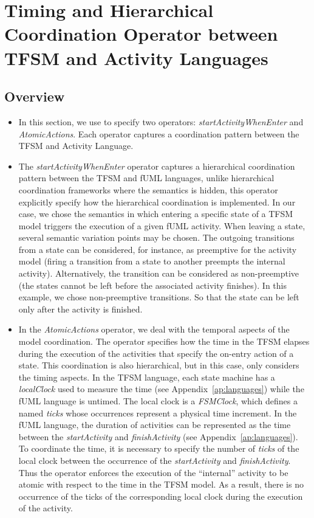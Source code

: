 \section{Timing and Hierarchical Coordination Operator between TFSM and Activity Languages}
\subsection{Overview}
	\begin{itemize}
		\item In this section, we use \bcool to specify two operators: \emph{startActivityWhenEnter} and \emph{AtomicActions}. Each operator captures a coordination pattern between the TFSM and Activity Language. 
		
		\item The \emph{startActivityWhenEnter} operator captures a hierarchical coordination pattern between the TFSM and fUML languages, unlike hierarchical coordination frameworks where the semantics is hidden, this operator explicitly specify how the hierarchical coordination is implemented. In our case, we chose the semantics in which entering a specific state of a TFSM model triggers the execution of a given fUML activity. When leaving a state, several semantic variation points may be chosen. The outgoing transitions from a state can be considered, for instance, as preemptive for the activity model (\ie firing a transition from a state to another preempts the internal activity). Alternatively, the transition can be considered as non-preemptive (\ie the states cannot be left before the associated activity finishes). In this example, we chose non-preemptive transitions. So that the state can be left only after the activity is finished. 
		
		\item In the \emph{AtomicActions} operator, we deal with the temporal aspects of the model coordination. The operator specifies how the time in the TFSM elapses during the execution of the activities that specify the on-entry action of a state. This coordination is also hierarchical, but in this case, only considers the timing aspects. In the TFSM language, each state machine has a \emph{localClock} used to measure the time (see Appendix~\ref{ap:languages}) while the fUML language is untimed. The local clock is a \emph{FSMClock}, which defines a \dse named \emph{ticks} whose occurrences represent a physical time increment. In the fUML language, the duration of activities can be represented as the time between the \dse \emph{startActivity} and \dse \emph{finishActivity} (see Appendix~\ref{ap:languages}). To coordinate the time, it is necessary to specify the number of \emph{ticks} of the local clock between the occurrence of the \dse \emph{startActivity} and \emph{finishActivity}. Thus the operator enforces the execution of the ``internal'' activity to be atomic with respect to the time in the TFSM model. As a result, there is no occurrence of the \dse ticks of the corresponding local clock during the execution of the activity.


\end{itemize}

